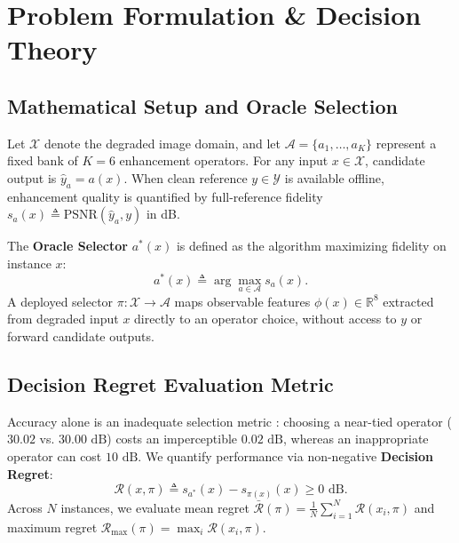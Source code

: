 \documentclass[journal]{IEEEtran}
\begin{document}
\section{Problem Formulation \& Decision Theory}

\subsection{Mathematical Setup and Oracle Selection}
Let $\mathcal{X}$ denote the degraded image domain, and let $\mathcal{A} = \{a_1, \dots, a_K\}$ represent a fixed bank of $K=6$ enhancement operators. For any input $x \in \mathcal{X}$, candidate output is $\hat{y}_a = a(x)$. When clean reference $y \in \mathcal{Y}$ is available offline, enhancement quality is quantified by full-reference fidelity $s_a(x) \triangleq \text{PSNR}(\hat{y}_a, y)$ in dB.

The \textbf{Oracle Selector} $a^*(x)$ is defined as the algorithm maximizing fidelity on instance $x$:
\begin{equation}
a^*(x) \triangleq \arg\max_{a \in \mathcal{A}} s_a(x).
\label{eq:oracle_definition}
\end{equation}
A deployed selector $\pi: \mathcal{X} \to \mathcal{A}$ maps observable features $\phi(x) \in \mathbb{R}^8$ extracted from degraded input $x$ directly to an operator choice, without access to $y$ or forward candidate outputs.

\subsection{Decision Regret Evaluation Metric}
Accuracy alone is an inadequate selection metric \cite{bischl2016aslib}: choosing a near-tied operator ($30.02$ vs. $30.00\text{ dB}$) costs an imperceptible $0.02\text{ dB}$, whereas an inappropriate operator can cost $10\text{ dB}$. We quantify performance via non-negative \textbf{Decision Regret}:
\begin{equation}
\mathcal{R}(x, \pi) \triangleq s_{a^*}(x) - s_{\pi(x)}(x) \ge 0\text{ dB}.
\label{eq:regret_definition}
\end{equation}
Across $N$ instances, we evaluate mean regret $\bar{\mathcal{R}}(\pi) = \frac{1}{N} \sum_{i=1}^N \mathcal{R}(x_i, \pi)$ and maximum regret $\mathcal{R}_{\max}(\pi) = \max_i \mathcal{R}(x_i, \pi)$.
\end{document}
